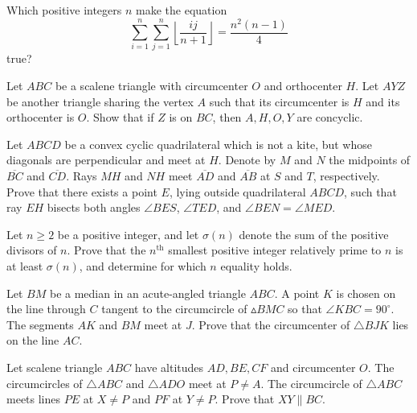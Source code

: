 \documentclass[11pt]{scrartcl}
\begin{document}
\begin{problem}[819328919046836]
Which positive integers $n$ make the equation\[\sum_{i=1}^n \sum_{j=1}^n \left\lfloor \frac{ij}{n+1} \right\rfloor=\frac{n^2(n-1)}{4}\]true?
\end{problem}
\begin{problem}[4948608980214807448]
	Let $ABC$ be a scalene triangle with circumcenter $O$ and orthocenter $H$. Let $AYZ$ be another triangle sharing the vertex $A$ such that its circumcenter is $H$ and its orthocenter is $O$. Show that if $Z$ is on $BC$, then $A,H,O,Y$ are concyclic.
\end{problem}
\begin{problem}[102296866595865]
	Let $ABCD$ be a convex cyclic quadrilateral which is not a kite, but whose diagonals are perpendicular and meet at $H$. Denote by $M$ and $N$ the midpoints of $\overline{BC}$ and $\overline{CD}$. Rays $MH$ and $NH$ meet $\overline{AD}$ and $\overline{AB}$ at $S$ and $T$, respectively. Prove that there exists a point $E$, lying outside quadrilateral $ABCD$, such that
ray $EH$ bisects both angles $\angle BES$, $\angle TED$, and
$\angle BEN = \angle MED$.
\end{problem}
\begin{problem}[3458270318471332488]
	Let $n \ge 2$ be a positive integer, and let $\sigma(n)$ denote the sum of the positive divisors of $n$. Prove that the $n^{\text{th}}$ smallest positive integer relatively prime to $n$ is at least $\sigma(n)$, and determine for which $n$ equality holds.
\end{problem}
\begin{problem}[1891712635906763103]
	Let $BM$ be a median in an acute-angled triangle $ABC$. A point $K$ is chosen on the line through $C$ tangent to the circumcircle of $\vartriangle BMC$ so that $\angle KBC = 90^\circ$. The segments $AK$ and $BM$ meet at $J$. Prove that the circumcenter of $\triangle BJK$ lies on the line $AC$.
\end{problem}
\begin{problem}[9153191064326230951]
Let scalene triangle $ABC$ have altitudes $AD, BE, CF$ and circumcenter $O$. The circumcircles of $\triangle ABC$ and $\triangle ADO$ meet at $P \ne A$. The circumcircle of $\triangle ABC$ meets lines $PE$ at $X \ne P$ and $PF$ at $Y \ne P$. Prove that $XY \parallel BC$.
\end{problem}
\end{document}
